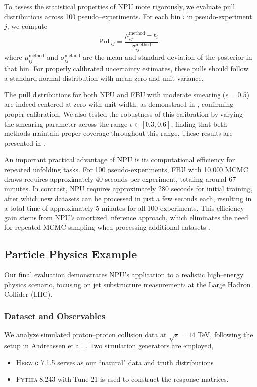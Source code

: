         To assess the statistical properties of NPU more rigorously, we evaluate pull distributions across 100 pseudo--experiments.
        For each bin $i$ in pseudo-experiment $j$, we compute
        \[
        \text{Pull}_{ij} = \frac{\mu^{\text{method}}_{ij} - t_i}{\sigma^{\text{method}}_{ij}}
        \]
        where $\mu^{\text{method}}_{ij}$ and $\sigma^{\text{method}}_{ij}$ are the mean and standard deviation of the posterior in that bin.
        For properly calibrated uncertainty estimates, these pulls should follow a standard normal distribution with mean zero and unit variance.

        The pull distributions for both NPU and FBU with moderate smearing ($\epsilon = 0.5$) are indeed centered at zero with unit width, as demonstraed in , confirming proper calibration.
        We also tested the robustness of this calibration by varying the smearing parameter across the range $\epsilon \in [0.3, 0.6]$, finding that both methods maintain proper coverage throughout this range.
        These results are presented in .

        An important practical advantage of NPU is its computational efficiency for repeated unfolding tasks.
        For 100 pseudo-experiments, FBU with 10,000 MCMC draws requires approximately 40 seconds per experiment, totaling around 67 minutes.
        In contrast, NPU requires approximately 280 seconds for initial training, after which new datasets can be processed in just a few seconds each, resulting in a total time of approximately 5 minutes for all 100 experiments.
        This efficiency gain stems from NPU's amortized inference approach, which eliminates the need for repeated MCMC sampling when processing additional datasets .

\subsection{Particle Physics Example}
    Our final evaluation demonstrates NPU's application to a realistic high--energy physics scenario, focusing on jet substructure measurements at the Large Hadron Collider (LHC).
    \subsubsection{Dataset and Observables}
        We analyze simulated proton--proton collision data at $\sqrt{s} = 14$ TeV, following the setup in Andreassen et al. .
        Two simulation generators are employed,
        \begin{itemize}
            \item \textsc{Herwig 7.1.5}  serves as our ``natural" data and truth distributions
            \item \textsc{Pythia 8.243} with Tune 21  is used to construct the response matrices.
        \end{itemize}
        

